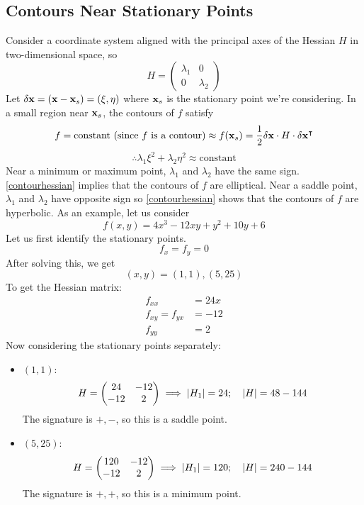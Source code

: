 \subsection{Contours Near Stationary Points}
Consider a coordinate system aligned with the principal axes of the Hessian \(H\) in two-dimensional space, so
\[
	H = \begin{pmatrix}
		\lambda_1 & 0 \\ 0 & \lambda_2
	\end{pmatrix}
\]
Let \(\delta \vb x = (\vb x - \vb x_s) = (\xi, \eta)\) where \(\vb x_s\) is the stationary point we're considering.
In a small region near \(\vb x_s\), the contours of \(f\) satisfy
\[
	f = \text{constant (since \(f\) is a contour)} \approx f(\vb x_s) = \frac{1}{2}\delta \vb x \cdot H \cdot \delta \vb x^\intercal
\]
\begin{equation}\label{contourhessian}
	\therefore \lambda_1 \xi^2 + \lambda_2 \eta^2 \approx \text{constant}
\end{equation}
Near a minimum or maximum point, \(\lambda_1\) and \(\lambda_2\) have the same sign.
\eqref{contourhessian} implies that the contours of \(f\) are elliptical.
Near a saddle point, \(\lambda_1\) and \(\lambda_2\) have opposite sign so \eqref{contourhessian} shows that the contours of \(f\) are hyperbolic.
As an example, let us consider
\[
	f(x,y) = 4x^3 - 12xy + y^2 + 10y + 6
\]
Let us first identify the stationary points.
\[
	f_x = f_y = 0
\]
After solving this, we get
\[
	(x,y) = (1, 1), (5, 25)
\]
To get the Hessian matrix:
\begin{align*}
	f_{xx}          & = 24x \\
	f_{xy} = f_{yx} & = -12 \\
	f_{yy}          & = 2
\end{align*}
Now considering the stationary points separately:
\begin{itemize}
	\item \((1, 1)\):
	      \[
		      H = \begin{pmatrix}
			      24 & -12 \\ -12 & 2
		      \end{pmatrix} \implies \abs{H_1} = 24;\quad \abs{H} = 48-144
	      \]
	      The signature is \(+, -\), so this is a saddle point.
	\item \((5, 25)\):
	      \[
		      H = \begin{pmatrix}
			      120 & -12 \\ -12 & 2
		      \end{pmatrix} \implies \abs{H_1} = 120;\quad \abs{H} = 240-144
	      \]
	      The signature is \(+, +\), so this is a minimum point.
\end{itemize}

